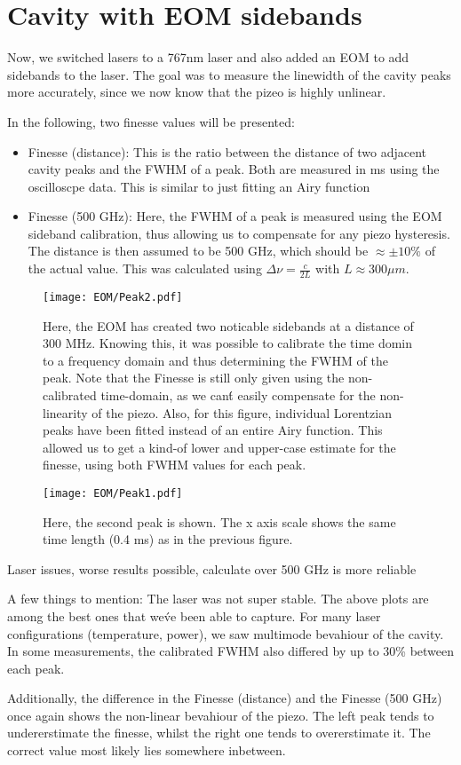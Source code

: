 \section{Cavity with EOM sidebands}
Now, we switched lasers to a 767nm laser and also added an EOM to add sidebands to the laser.
The goal was to measure the linewidth of the cavity peaks more accurately, since we now know that the pizeo is highly unlinear.

In the following, two finesse values will be presented: 
\begin{itemize}
    \item Finesse (distance): This is the ratio between the distance of two adjacent cavity peaks and the FWHM of a peak. Both are measured in ms using the oscilloscpe data. This is similar to just fitting an Airy function
    \item Finesse (500 GHz): Here, the FWHM of a peak is measured using the EOM sideband calibration, thus allowing us to compensate for any piezo hysteresis. The distance is then assumed to be 500 GHz, which should be $\approx \pm 10\%$ of the actual value. This was calculated using $\Delta \nu = \frac{c}{2L}$ with $L\approx300 \mu m$.
\end{itemize}


\begin{figure}[H]
    \centering
    \texttt{[image: EOM/Peak2.pdf]}
    \caption{Here, the EOM has created two noticable sidebands at a distance of 300 MHz. Knowing this, it was possible to calibrate the time domin to a frequency domain and thus determining the FWHM of the peak. Note that the Finesse is still only given using the non-calibrated time-domain, as we can\'t easily compensate for the non-linearity of the piezo. Also, for this figure, individual Lorentzian peaks have been fitted instead of an entire Airy function. This allowed us to get a kind-of lower and upper-case estimate for the finesse, using both FWHM values for each peak.}
\end{figure}

\begin{figure}[H]
    \centering
    \texttt{[image: EOM/Peak1.pdf]}
    \caption{Here, the second peak is shown. The x axis scale shows the same time length (0.4 ms) as in the previous figure.}
\end{figure}


Laser issues, worse results possible, calculate over 500 GHz is more reliable

A few things to mention: The laser was not super stable. The above plots are among the best ones that we\'ve been able to capture. For many laser configurations (temperature, power), we saw multimode bevahiour of the cavity.
In some measurements, the calibrated FWHM also differed by up to 30\% between each peak.

Additionally, the difference in the Finesse (distance) and the Finesse (500 GHz) once again shows the non-linear bevahiour of the piezo.
The left peak tends to undererstimate the finesse, whilst the right one tends to overerstimate it. The correct value most likely lies somewhere inbetween.
